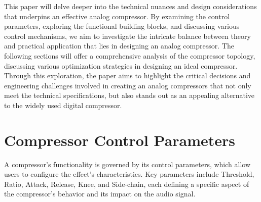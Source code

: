 \documentclass[10pt]{article}
\begin{document}
\begin{multicols*}{2}
            This paper will delve deeper into the technical nuances and design considerations that underpins an effective analog compressor. By examining the control parameters, exploring the functional building blocks, and discussing various control mechanisms, we aim to investigate the intricate balance between theory and practical application that lies in designing an analog compressor. The following sections will offer a comprehensive analysis of the compressor topology, discussing various optimization strategies in designing an ideal compressor. Through this exploration, the paper aims to highlight the critical decisions and engineering challenges involved in creating an analog compressors that not only meet the technical specifications, but also stands out as an appealing alternative to the widely used digital compressor.

        \section{Compressor Control Parameters}
            A compressor's functionality is governed by its control parameters, which allow users to configure the effect's characteristics. Key parameters include Threshold, Ratio, Attack, Release, Knee, and Side-chain, each defining a specific aspect of the compressor's behavior and its impact on the audio signal.

            \noindent
            \begin{minipage}{\linewidth}
                \centering
\end{minipage}
\end{multicols*}
\end{document}
